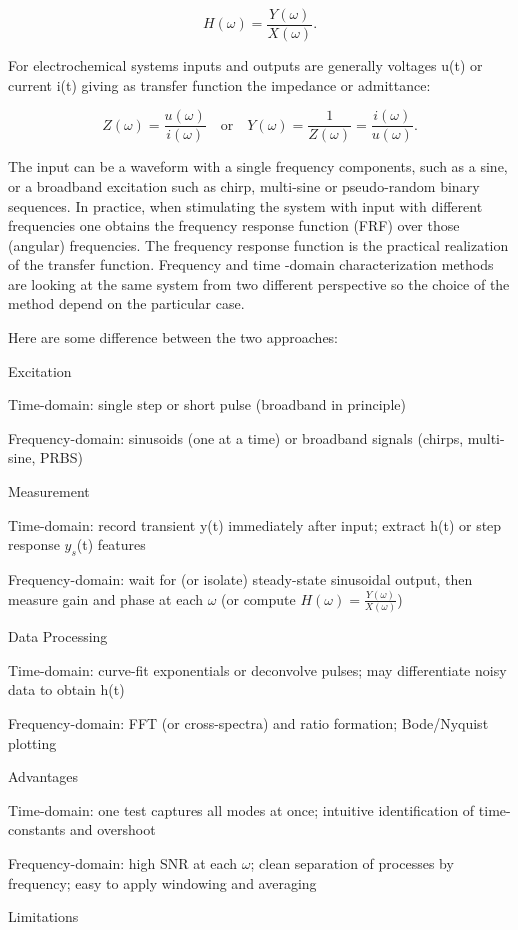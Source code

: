 $$
H(\omega) = \frac{Y(\omega)}{X(\omega)}.
$$

For electrochemical systems inputs and outputs are generally voltages u(t) or current i(t) giving as transfer function the impedance or admittance:

$$
Z(\omega) = \frac{u(\omega)}{i(\omega)} \quad \text{or} \quad Y(\omega) = \frac{1}{Z(\omega)}= \frac{i(\omega)}{u(\omega)}.
$$

The input can be a waveform with a single frequency components, such as a sine, or a broadband excitation such as chirp, multi-sine or pseudo-random binary sequences. In practice, when stimulating the system with input with different frequencies one obtains the frequency response function (FRF) over those (angular) frequencies. The frequency response function is the practical realization of the transfer function. 
Frequency and time -domain characterization methods are looking at the same system from two different perspective so the choice of the method depend on the particular case.

Here are some difference between the two approaches:

Excitation

Time-domain: single step or short pulse (broadband in principle)\

Frequency-domain: sinusoids (one at a time) or broadband signals (chirps, multi-sine, PRBS)

Measurement

Time-domain: record transient y(t) immediately after input; extract h(t) or step response $y_s$(t) features

Frequency-domain: wait for (or isolate) steady-state sinusoidal output, then measure gain and phase at each $\omega$ (or compute $H(\omega)=\frac{Y(\omega)}{X(\omega)}$)

Data Processing

Time-domain: curve-fit exponentials or deconvolve pulses; may differentiate noisy data to obtain h(t)

Frequency-domain: FFT (or cross-spectra) and ratio formation; Bode/Nyquist plotting

Advantages

Time-domain: one test captures all modes at once; intuitive identification of time-constants and overshoot

Frequency-domain: high SNR at each $\omega$; clean separation of processes by frequency; easy to apply windowing and averaging

Limitations

